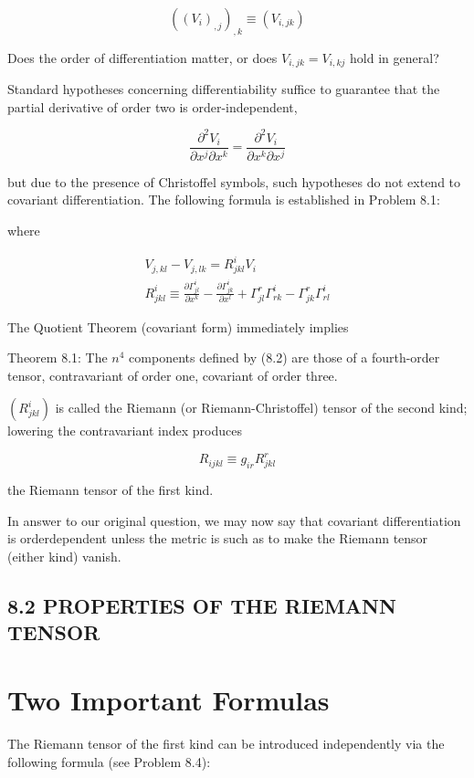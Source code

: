 \documentclass[10pt]{article}
\begin{document}
$$
\left(\left(V_{i}\right)_{, j}\right)_{, k} \equiv\left(V_{i, j k}\right)
$$

Does the order of differentiation matter, or does $V_{i, j k}=V_{i, k j}$ hold in general?

Standard hypotheses concerning differentiability suffice to guarantee that the partial derivative of order two is order-independent,

$$
\frac{\partial^{2} V_{i}}{\partial x^{j} \partial x^{k}}=\frac{\partial^{2} V_{i}}{\partial x^{k} \partial x^{j}}
$$

but due to the presence of Christoffel symbols, such hypotheses do not extend to covariant differentiation. The following formula is established in Problem 8.1:

where


\begin{gather*}
V_{j, k l}-V_{j, l k}=R_{j k l}^{i} V_{i}  \tag{8.1}\\
R_{j k l}^{i} \equiv \frac{\partial \Gamma_{j l}^{i}}{\partial x^{k}}-\frac{\partial \Gamma_{j k}^{i}}{\partial x^{l}}+\Gamma_{j l}^{r} \Gamma_{r k}^{i}-\Gamma_{j k}^{r} \Gamma_{r l}^{i} \tag{8.2}
\end{gather*}


The Quotient Theorem (covariant form) immediately implies

Theorem 8.1: The $n^{4}$ components defined by (8.2) are those of a fourth-order tensor, contravariant of order one, covariant of order three.

$\left(R_{j k l}^{i}\right)$ is called the Riemann (or Riemann-Christoffel) tensor of the second kind; lowering the contravariant index produces


\begin{equation*}
R_{i j k l} \equiv g_{i r} R_{j k l}^{r} \tag{8.3}
\end{equation*}


the Riemann tensor of the first kind.

In answer to our original question, we may now say that covariant differentiation is orderdependent unless the metric is such as to make the Riemann tensor (either kind) vanish.

\subsection*{8.2 PROPERTIES OF THE RIEMANN TENSOR}
\section*{Two Important Formulas}
The Riemann tensor of the first kind can be introduced independently via the following formula (see Problem 8.4):
\end{document}
